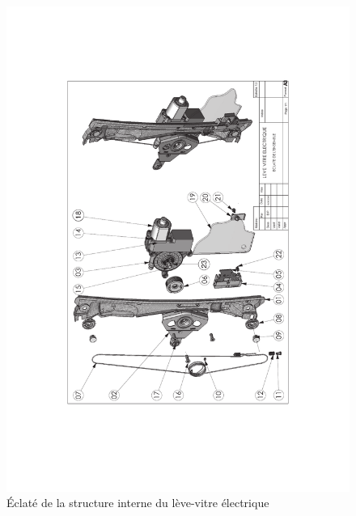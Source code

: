 \begin{figure}[!h]
 \centering\includegraphics[width=0.9\linewidth]{img/eclate1}
 \caption{Éclaté de la structure interne du lève-vitre électrique}
 \label{an01}
\end{figure}

